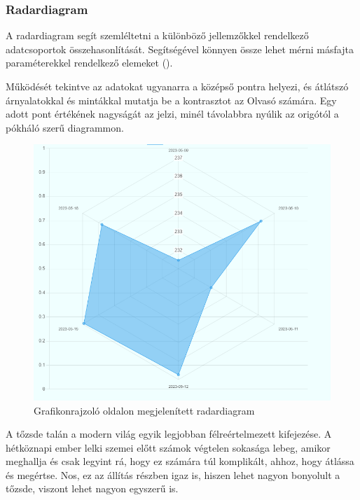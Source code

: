 \subsubsection{Radardiagram}

A radardiagram segít szemléltetni a különböző jellemzőkkel rendelkező adatcsoportok összehasonlítását. Segítségével könnyen össze lehet mérni másfajta paraméterekkel rendelkező elemeket ().

	Működését tekintve az adatokat ugyanarra a középső pontra helyezi, és átlátszó árnyalatokkal és mintákkal mutatja be a kontrasztot az Olvasó számára. Egy adott pont értékének nagyságát az jelzi, minél távolabbra nyúlik az origótól a pókháló szerű diagrammon.

\begin{figure}[h]
\centering
\includegraphics[scale=0.4]{images/radarChartExample}
\caption{Grafikonrajzoló oldalon megjelenített radardiagram}
\label{fig:radarChartExample}
\end{figure}


A tőzsde talán a modern világ egyik legjobban félreértelmezett kifejezése. A hétköznapi ember lelki szemei előtt számok végtelen sokasága lebeg, amikor meghallja és csak legyint rá, hogy ez számára túl komplikált, ahhoz, hogy átlássa és megértse. Nos, ez az állítás részben igaz is, hiszen lehet nagyon bonyolult a tőzsde, viszont lehet nagyon egyszerű is.

